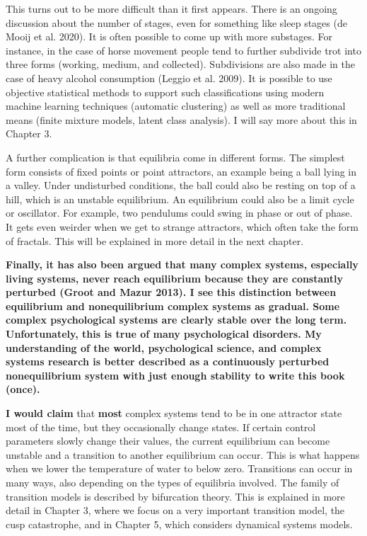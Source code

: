 \documentclass[
  letterpaper,
]{scrbook}
\begin{document}
This turns out to be more difficult than it first appears. There is an
ongoing discussion about the number of stages, even for something like
sleep stages (de Mooij et al. 2020). It is often possible to come up
with more substages. For instance, in the case of horse movement people
tend to further subdivide trot into three forms (working, medium, and
collected). Subdivisions are also made in the case of heavy alcohol
consumption (Leggio et al. 2009). It is possible to use objective
statistical methods to support such classifications using modern machine
learning techniques (automatic clustering) as well as more traditional
means (finite mixture models, latent class analysis). I will say more
about this in Chapter 3.

A further complication is that equilibria come in different forms. The
simplest form consists of fixed points or point attractors, an example
being a ball lying in a valley. Under undisturbed conditions, the ball
could also be resting on top of a hill, which is an unstable
equilibrium. An equilibrium could also be a limit cycle or oscillator.
For example, two pendulums could swing in phase or out of phase. It gets
even weirder when we get to strange attractors, which often take the
form of fractals. This will be explained in more detail in the next
chapter.

\textbf{Finally, it has also been argued that many complex systems,
especially living systems, never reach equilibrium because they are
constantly perturbed (Groot and Mazur 2013). I see this distinction
between equilibrium and nonequilibrium complex systems as gradual. Some
complex psychological systems are clearly stable over the long term.
Unfortunately, this is true of many psychological disorders. My
understanding of the world, psychological science, and complex systems
research is better described as a continuously perturbed nonequilibrium
system with just enough stability to write this book (once).}

\textbf{I would claim} that \textbf{most} complex systems tend to be in
one attractor state most of the time, but they occasionally change
states. If certain control parameters slowly change their values, the
current equilibrium can become unstable and a transition to another
equilibrium can occur. This is what happens when we lower the
temperature of water to below zero. Transitions can occur in many ways,
also depending on the types of equilibria involved. The family of
transition models is described by bifurcation theory. This is explained
in more detail in Chapter 3, where we focus on a very important
transition model, the cusp catastrophe, and in Chapter 5, which
considers dynamical systems models.
\end{document}
